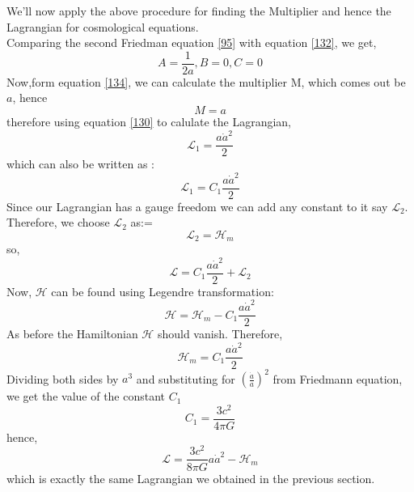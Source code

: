 \documentclass[12pt]{article}
\begin{document}
We'll now apply the above procedure for finding the Multiplier and hence the Lagrangian for cosmological equations.\\
Comparing the second Friedman equation \eqref{95} with equation \eqref{132}, we get,
\begin{equation}
A=\frac{1}{2 a} , B=0, C=0
\end{equation}
Now,form equation \eqref{134}, we can calculate the multiplier M, which comes out be $a$, hence
\begin{equation}
M=a
\end{equation}
therefore using equation \eqref{130} to calulate the Lagrangian,
\begin{equation}
\mathcal{L}_{1} = \frac{a \dot{a}^{2}}{2} 
\end{equation}
which can also be written as :
\begin{equation}
\mathcal{L}_{1}=C_{1}\frac{a \dot{a}^{2}}{2}
\end{equation}
Since our Lagrangian has a gauge freedom we can add any constant to it say $\mathcal{L}_{2}$. Therefore, we choose $\mathcal{L}_{2}$ as:=
\begin{equation}
\mathcal{L}_{2} = \mathcal{H}_{m}
\end{equation}
so,
\begin{equation}
\mathcal{L}= C_{1} \frac{a \dot{a}^{2}}{2} + \mathcal{L}_{2}
\end{equation}
Now, $\mathcal{H}$ can be found using Legendre transformation:
\begin{equation}
\mathcal{H} = \mathcal{H}_{m} - C_{1} \frac{a \dot{a}^{2}}{2}
\end{equation}
As before the Hamiltonian $\mathcal{H}$ should vanish. Therefore,
\begin{equation}
\mathcal{H}_{m} = C_{1} \frac{a \dot{a}^{2}}{2}
\end{equation} 
Dividing both sides by $a^{3}$ and substituting for $\left(\frac{\dot{a}}{a}\right)^{2}$ from Friedmann equation, we get the value of the constant $C_{1}$
\begin{equation}
C_{1} = \frac{3 c^{2}}{4 \pi G}
\end{equation}
hence, 
\begin{equation}
\mathcal{L}= \frac{3 c^{2}}{8 \pi G} a \dot{a}^{2} - \mathcal{H}_{m}
\end{equation}
which is exactly the same Lagrangian we obtained in the previous section.
\end{document}
